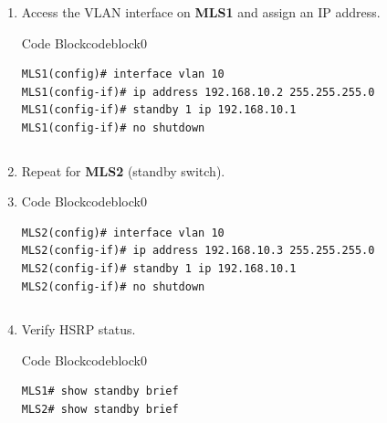 \documentclass[a4paper]{book}
\begin{document}
\begin{enumerate}
\item Access the VLAN interface on \textbf{MLS1} and assign an IP address.


\vspace{1.5em}



\begin{ocg}{Code Block}{codeblock}{0}
\vspace{0.5cm}
\begin{lstlisting}
MLS1(config)# interface vlan 10
MLS1(config-if)# ip address 192.168.10.2 255.255.255.0
MLS1(config-if)# standby 1 ip 192.168.10.1
MLS1(config-if)# no shutdown
\end{lstlisting}

\end{ocg}

\begin{lstlisting}

\end{lstlisting}

\item Repeat for \textbf{MLS2} (standby switch).
\item 
\vspace{1.5em}



\begin{ocg}{Code Block}{codeblock}{0}
\vspace{0.5cm}
\begin{lstlisting}
MLS2(config)# interface vlan 10
MLS2(config-if)# ip address 192.168.10.3 255.255.255.0
MLS2(config-if)# standby 1 ip 192.168.10.1
MLS2(config-if)# no shutdown
\end{lstlisting}

\end{ocg}
\begin{lstlisting}

\end{lstlisting}

\item Verify HSRP status.
\vspace{1.5em}



\begin{ocg}{Code Block}{codeblock}{0}
\vspace{0.5cm}
\begin{lstlisting}
MLS1# show standby brief
MLS2# show standby brief
\end{lstlisting}

\end{ocg}
\end{enumerate}
\end{document}
